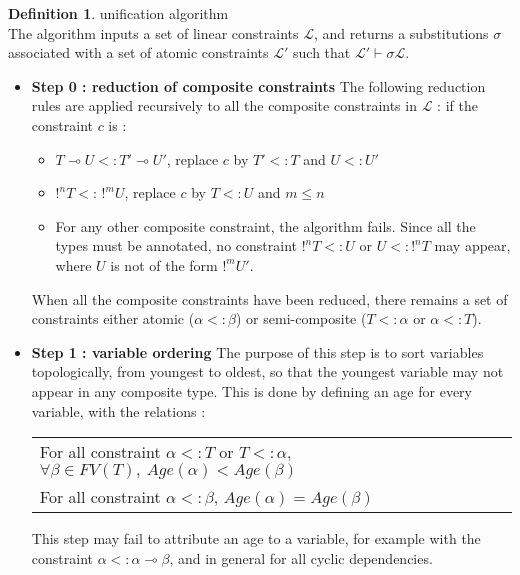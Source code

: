 \documentclass[10pt]{article}
\theoremstyle{plain}
\theoremstyle{definition}
\newtheorem{defn}{Definition}[subsection] %
\begin{document}
\begin{defn}{unification algorithm} \\
	The algorithm inputs a set of linear constraints $\mathcal{L}$, and returns
	a substitutions $\sigma$ associated with a set of atomic constraints $\mathcal{L'}$ such that
	$\mathcal{L'} \vdash \sigma \mathcal{L}$.
	
  \begin{itemize}
  	\item{\bf Step 0 : reduction of composite constraints} The following reduction rules are applied recursively to all the composite
  		constraints in $\mathcal{L}$ : if the constraint $c$ is :
  		\begin{itemize}
      	\item $T \multimap U <: T' \multimap U'$, replace $c$ by $T' <: T$ and $U <: U'$
      	\item $!^n T <: \, !^m U$, replace $c$ by $T <: U$ and $m \le n$
      	\item For any other composite constraint, the algorithm fails. Since all the types must be annotated, no constraint
      		$!^n T <: U$ or $U <: !^n T$ may appear, where $U$ is not of the form $!^m U'$.
      \end{itemize}
      When all the composite constraints have been reduced, there remains a set of constraints either atomic ($\alpha <: \beta$) or
      semi-composite ($T <: \alpha$ or $\alpha <: T$).  		
  		
  	\item{\bf Step 1 : variable ordering} The purpose of this step is to sort variables topologically, from youngest to oldest,
  	  so that the youngest variable may not appear in any composite type. This is done by defining an age for every variable, with the
  	  relations :
  	  	\begin{center}
  	  	\begin{tabular}{l}
  	  		For all constraint $\alpha <: T$ or $T <: \alpha$, $\forall \beta \in FV(T), ~ Age (\alpha) < Age (\beta)$ \\
  	  		For all constraint $\alpha <: \beta$, $Age (\alpha) = Age (\beta)$
  	  	\end{tabular}
  	  	\end{center}
  	  This step may fail to attribute an age to a variable, for example with the constraint $\alpha <: \alpha \multimap \beta$, and
  	  in general for all cyclic dependencies.
  	  

\end{itemize}
\end{defn}
\end{document}
